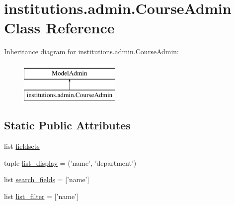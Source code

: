 \hypertarget{classinstitutions_1_1admin_1_1_course_admin}{\section{institutions.\-admin.\-Course\-Admin Class Reference}
\label{classinstitutions_1_1admin_1_1_course_admin}
}
Inheritance diagram for institutions.\-admin.\-Course\-Admin\-:\begin{figure}[H]
\begin{center}
\leavevmode
\includegraphics[height=2.000000cm]{classinstitutions_1_1admin_1_1_course_admin}
\end{center}
\end{figure}
\subsection*{Static Public Attributes}
\begin{DoxyCompactItemize}
\item 
list \hyperlink{classinstitutions_1_1admin_1_1_course_admin_ac168d91a1bae0bd65963653ce18362f7}{fieldsets}
\item 
tuple \hyperlink{classinstitutions_1_1admin_1_1_course_admin_aaa0484f1e6ef42ee85f01fca6b3ce723}{list\-\_\-display} = ('name', 'department')
\item 
list \hyperlink{classinstitutions_1_1admin_1_1_course_admin_a8a24f7aeef7ef599ba4e44f2d91232ff}{search\-\_\-fields} = \mbox{[}'name'\mbox{]}
\item 
list \hyperlink{classinstitutions_1_1admin_1_1_course_admin_aaa38c59ff54a7472196d5fbdc360bcf1}{list\-\_\-filter} = \mbox{[}'name'\mbox{]}
\end{DoxyCompactItemize}


